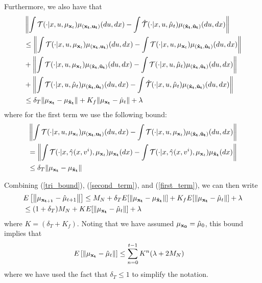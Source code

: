 \documentclass[twoside,11pt]{article}
\begin{document}
Furthermore, we also have that
\begin{align}\label{first_term}
&\left\| \int  \mathcal{T}(\cdot|x,u,\mu_{{\bf x}_t}) \mu_{\bf (x_t,u_t)}(du,dx) - \int\hat{\mathcal{T}}(\cdot|x,u,\hat{\mu}_t) \mu_{(\bf \hat{x}_t , \hat{u}_t)}(du,dx)\right\|\nonumber\\
&\leq \left\| \int  \mathcal{T}(\cdot|x,u,\mu_{{\bf x}_t}) \mu_{\bf (x_t,u_t)}(du,dx) - \int{\mathcal{T}}(\cdot|x,u,\mu_{{\bf x}_t}) \mu_{(\bf \hat{x}_t , \hat{u}_t)}(du,dx)\right\|\nonumber\\
& + \left\|    \int{\mathcal{T}}(\cdot|x,u,\mu_{{\bf x}_t}) \mu_{(\bf \hat{x}_t , \hat{u}_t)}(du,dx) -  \int{\mathcal{T}}(\cdot|x,u, \hat{\mu}_t) \mu_{(\bf \hat{x}_t , \hat{u}_t)}(du,dx)\right\|\nonumber\\
& + \left\|  \int{\mathcal{T}}(\cdot|x,u, \hat{\mu}_t) \mu_{(\bf \hat{x}_t , \hat{u}_t)}(du,dx) -  \int\hat{\mathcal{T}}(\cdot|x,u,\hat{\mu}_t) \mu_{(\bf \hat{x}_t , \hat{u}_t)}(du,dx)\right\|\nonumber\\
&\leq \delta_T \|\mu_{\bf x_t} - \mu_{\bf \hat{x}_t}\| + K_f \| \mu_{\bf x_t} - \hat{\mu}_t\| + \lambda
\end{align}
where for the first term we use the following bound:
\begin{align*}
&\left\| \int  \mathcal{T}(\cdot|x,u,\mu_{{\bf x}_t}) \mu_{\bf (x_t,u_t)}(du,dx) - \int{\mathcal{T}}(\cdot|x,u,\mu_{{\bf x}_t}) \mu_{(\bf \hat{x}_t , \hat{u}_t)}(du,dx)\right\|\\
& = \left\| \int  \mathcal{T}(\cdot|x,\hat{\gamma}(x,v^i),\mu_{{\bf x}_t})  \mu_{\bf x_t}(dx) - \int{\mathcal{T}}(\cdot|x,\hat{\gamma}(x,v^i),\mu_{{\bf x}_t}) \mu_{\bf \hat{x}_t}(dx)\right\|\\
& \leq \delta_T \|\mu_{\bf x_t} - \mu_{\bf \hat{x}_t}\| 
\end{align*}

Combining (\ref{tri_bound}), (\ref{second_term}), and (\ref{first_term}), we can then write
\begin{align*}
&E\left[ \left\|\mu_{\bf x_{t+1}} - \hat{\mu}_{t+1}\right\|\right]  \leq M_N  + \delta_T E[ \|\mu_{\bf x_t} - \mu_{\bf \hat{x}_t}\| ] + K_f E[ \| \mu_{\bf x_t} - \hat{\mu}_t\| ] + \lambda\\
&\leq (1+\delta_T)M_N + K E[ \| \mu_{\bf x_t} - \hat{\mu}_t\| ]  + \lambda
\end{align*}
where $K=(\delta_T + K_f)$.  Noting that we have assumed $\mu_{\bf x_0} = \hat{\mu}_0$, this bound implies that
\begin{align*}
&E\left[ \left\|\mu_{\bf x_{t}} - \hat{\mu}_{t}\right\|\right]  \leq \sum_{n=0}^{t-1} K^n( \lambda + 2 M_N )
\end{align*}
where we have used the fact that $\delta_T\leq 1$ to simplify the notation.
\end{document}
